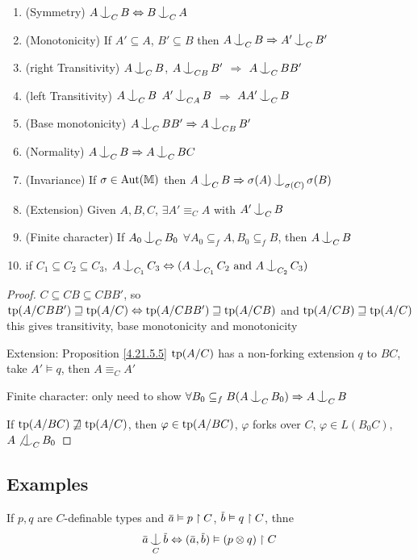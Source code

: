 \documentclass[11pt]{article}
\begin{document}
\begin{proposition}[]
\label{4.28.10.6}
\begin{enumerate}
\item (Symmetry) \(A\ind_CB\Leftrightarrow B\ind_CA\)
\item (Monotonicity) If \(A'\subseteq A\), \(B'\subseteq B\) then \(A\ind_CB\Rightarrow A'\ind_CB'\)
\item (right Transitivity) \(A\ind_CB\), \(A\ind_{CB}B'\) \(\Rightarrow\) \(A\ind_CBB'\)
\item (left Transitivity) \(A\ind_CB\) \(A'\ind_{CA}B\) \(\Rightarrow\) \(AA'\ind_CB\)
\item (Base monotonicity) \(A\ind_C BB'\Rightarrow A\ind_{CB}B'\)
\item (Normality) \(A\ind_CB\Rightarrow A\ind_CBC\)
\item (Invariance) If \(\sigma\in\operatorname{\text{Aut}}(\mathbb{M})\) then \(A\ind_CB\Rightarrow\sigma(A)\ind_{\sigma(C)}\sigma(B)\)
\item (Extension) Given \(A,B,C\), \(\exists A'\equiv_CA\) with \(A'\ind_CB\)
\item (Finite character) If \(A_0\ind_CB_0\) \(\forall A_0\subseteq_fA,B_0\subseteq_fB\), then \(A\ind_CB\)
\item if \(C_1\subseteq C_2\subseteq C_3\), \(A\ind_{C_1}C_3\Leftrightarrow(A\ind_{C_1}C_2\text{ and }A\ind_{C_2}C_3)\)
\end{enumerate}
\end{proposition}

\begin{proof}
\(C\subseteq CB\subseteq CBB'\), so \(\operatorname{tp}(A/CBB')\sqsupseteq\operatorname{tp}(A/C)\Leftrightarrow\operatorname{tp}(A/CBB')\sqsupseteq\operatorname{tp}(A/CB)\) and
\(\operatorname{tp}(A/CB)\sqsupseteq\operatorname{tp}(A/C)\)
this gives transitivity, base monotonicity and monotonicity

Extension: Proposition \ref{4.21.5.5} \(\operatorname{tp}(A/C)\) has a non-forking extension \(q\) to \(BC\),
take \(A'\vDash q\), then \(A\equiv_CA'\)

Finite character: only need to show \(\forall B_0\subseteq_fB(A\ind_CB_0)\Rightarrow A\ind_CB\)

If \(\operatorname{tp}(A/BC)\not\sqsupseteq\operatorname{tp}(A/C)\), then \(\varphi\in\operatorname{tp}(A/BC)\), \(\varphi\) forks over \(C\), \(\varphi\in L(B_0C)\), \(A\not\ind_CB_0\)
\end{proof}

\subsection{Examples}
\label{sec:org1b8ac82}
\begin{proposition}[]
If \(p,q\) are \(C\)-definable types and \(\bara\vDash p\uhr C\), \(\barb\vDash q\uhr C\), thne
\begin{equation*}
\bara\ind_C\barb\Leftrightarrow(\bara,\barb)\vDash(p\otimes q)\uhr C
\end{equation*}
\end{proposition}
\end{document}
